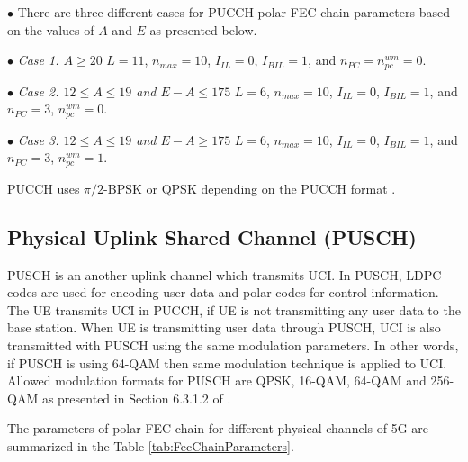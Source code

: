 $\bullet$ There are three different cases for PUCCH polar FEC chain parameters based on the values of $A$ and $E$ as presented below. \newline

$\bullet$ \emph{Case 1. $A \geq 20 $} \newline
\hspace*{2em}$L = 11$, $n_{max} = 10$, $I_{IL} = 0$, $I_{BIL} = 1$, and $n_{PC} = n_{pc}^{wm} = 0$. \newline
	 
$\bullet$ \emph{Case 2. $12 \leq A \leq 19 $ and $E-A \leq 175 $} \newline
\hspace*{2em}$L = 6$, $n_{max} = 10$, $I_{IL} = 0$, $I_{BIL} = 1$, and $n_{PC} = 3 $, $n_{pc}^{wm} = 0$. \newline

$\bullet$ \emph{Case 3. $12 \leq A \leq 19 $ and $E-A \geq 175 $} \newline
\hspace*{2em}$L = 6$, $n_{max} = 10$, $I_{IL} = 0$, $I_{BIL} = 1$, and $n_{PC} = 3 $, $n_{pc}^{wm} = 1$. \newline

PUCCH uses $\pi/2$-BPSK or QPSK depending on the PUCCH format \cite{3gpp.38.211}.

\subsection{Physical Uplink Shared Channel (PUSCH)}
PUSCH is an another uplink channel which transmits UCI. In PUSCH, LDPC codes are used for encoding user data and polar codes for control information. The UE transmits UCI in PUCCH, if UE is not transmitting any user data to the base station. When UE is transmitting user data through PUSCH, UCI is also transmitted with PUSCH using the same modulation parameters. In other words, if PUSCH is using 64-QAM then same modulation technique is applied to UCI. Allowed modulation formats for PUSCH are QPSK, 16-QAM, 64-QAM and 256-QAM as presented in Section 6.3.1.2 of \cite{3gpp.38.211}. \newline

The parameters of polar FEC chain for different physical channels of 5G are summarized in the Table \ref{tab:FecChainParameters}.

